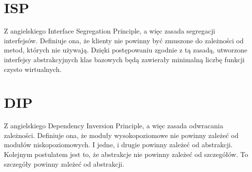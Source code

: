 \section{ISP}
Z angielskiego Interface Segregation Principle, a więc zasada segregacji interfejsów.
Definiuje ona, że klienty nie powinny być zmuszone do zależności od metod, których nie używają.\autocite[151]{martin2015zwinne}
Dzięki postępowaniu zgodnie z tą zasadą, utworzone interfejsy abstrakcyjnych klas bazowych będą zawierały minimalną liczbę funkcji czysto wirtualnych.

\section{DIP}
Z angielskiego Dependency Inversion Principle, a więc zasada odwracania zależności.
Definiuje ona, że moduły wysokopoziomowe nie powinny zależeć od modułów niskopoziomowych. I jedne, i drugie powinny zależeć od abstrakcji.\autocite[141]{martin2015zwinne}
Kolejnym postulatem jest to, że abstrakcje nie powinny zależeć od szczegółów. To szczegóły powinny zależeć od abstrakcji.\autocite[141]{martin2015zwinne}
